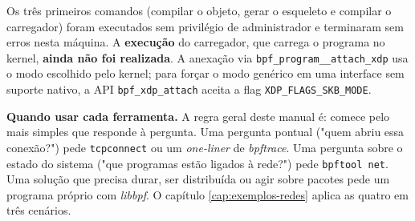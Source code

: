 Os três primeiros comandos (compilar o objeto, gerar o esqueleto e compilar o
carregador) foram executados sem privilégio de administrador e terminaram sem erros
nesta máquina. A \textbf{execução} do carregador, que carrega o programa no kernel,
\textbf{ainda não foi realizada}. A anexação via \texttt{bpf\_program\_\_attach\_xdp}
usa o modo escolhido pelo kernel; para forçar o modo genérico em uma interface sem
suporte nativo, a API \texttt{bpf\_xdp\_attach} aceita a flag
\texttt{XDP\_FLAGS\_SKB\_MODE}.

\textbf{Quando usar cada ferramenta.} A regra geral deste manual é: comece pelo mais
simples que responde à pergunta. Uma pergunta pontual ("quem abriu essa conexão?")
pede \texttt{tcpconnect} ou um \textit{one-liner} de \textit{bpftrace}. Uma pergunta
sobre o estado do sistema ("que programas estão ligados à rede?") pede
\texttt{bpftool net}. Uma solução que precisa durar, ser distribuída ou agir sobre
pacotes pede um programa próprio com \textit{libbpf}. O capítulo
\ref{cap:exemplos-redes} aplica as quatro em três cenários.
